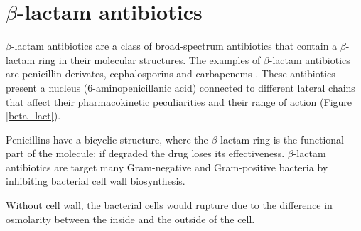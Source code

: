 \documentclass[11pt]{report}
\begin{document}
\section{$\beta$-lactam antibiotics}
$\beta$-lactam antibiotics are a class of broad-spectrum antibiotics that contain a $\beta$-lactam ring in their molecular structures.
The examples of $\beta$-lactam antibiotics are penicillin derivates, cephalosporins and carbapenems \cite{Pitout2005}.
These antibiotics present a nucleus (6-aminopenicillanic acid) connected to different lateral chains that affect their pharmacokinetic peculiarities and their range of action (Figure \ref{beta_lact}).

Penicillins have a bicyclic structure, where the $\beta$-lactam ring is the functional part of the molecule: if degraded the drug loses its effectiveness.
$\beta$-lactam antibiotics are target many Gram-negative and Gram-positive bacteria by inhibiting bacterial cell wall biosynthesis.

Without cell wall, the bacterial cells would rupture due to the difference in osmolarity between the inside and the outside of the cell.
\end{document}
